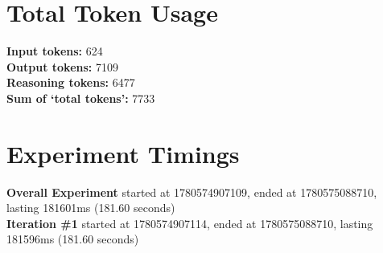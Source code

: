 \documentclass{article}
\begin{document}
\section*{Total Token Usage}
\textbf{Input tokens: }624
\\\textbf{Output tokens: }7109
\\\textbf{Reasoning tokens: }6477
\\\textbf{Sum of `total tokens': }7733
\section*{Experiment Timings}
\textbf{Overall Experiment} started at 1780574907109, ended at 1780575088710, lasting 181601ms (181.60 seconds)
\\\textbf{Iteration \#1} started at 1780574907114, ended at 1780575088710, lasting 181596ms (181.60 seconds)
\end{document}
